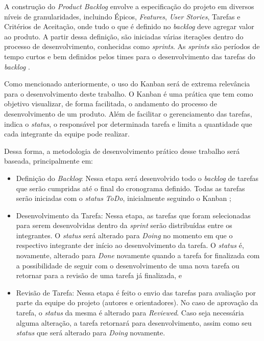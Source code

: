 A construção do \textit{Product Backlog} envolve a especificação do projeto em diversos níveis 
de granularidades, incluindo Épicos, \textit{Features}, \textit{User Stories}, Tarefas e Critérios de 
Aceitação, onde tudo o que é definido no \textit{backlog} deve agregar valor ao produto. A partir 
dessa definição, são iniciadas várias iterações dentro do processo de desenvolvimento, conhecidas 
como \textit{sprints}. As \textit{sprints} são períodos de tempo curtos e bem definidos pelos times 
para o desenvolvimento das tarefas do \textit{backlog} \cite{sutherland2014scrum}.

Como mencionado anteriormente, o uso do Kanban será de extrema relevância para o desenvolvimento deste 
trabalho. O Kanban é uma prática que tem como objetivo visualizar, de forma facilitada, o andamento do processo de 
desenvolvimento de um produto. Além de facilitar o gerenciamento das tarefas, indica o \textit{status}, o responsável 
por determinada tarefa e limita a quantidade que cada integrante da equipe pode realizar.

Dessa forma, a metodologia de desenvolvimento prático desse trabalho será baseada, principalmente em:

\begin{itemize}
    \item Definição do \textit{Backlog}: Nessa etapa será desenvolvido todo o \textit{backlog} de 
    tarefas que serão cumpridas até o final do cronograma definido. Todas as tarefas serão iniciadas 
    com o \textit{status} \textit{ToDo}, inicialmente seguindo o Kanban \cite{ahmad2013kanban};
    \item Desenvolvimento da Tarefa: Nessa etapa, as tarefas que foram selecionadas para serem desenvolvidas 
    dentro da \textit{sprint} serão distribuídas entre os integrantes. O \textit{status} será alterado 
    para \textit{Doing} no momento em que o respectivo integrante der início ao desenvolvimento da tarefa. 
    O \textit{status} é, novamente, alterado para \textit{Done} novamente quando a tarefa for finalizada com 
    a possibilidade de seguir com o desenvolvimento de uma nova tarefa ou retornar para a revisão de uma 
    tarefa já finalizada, e
    \item Revisão de Tarefa: Nessa etapa é feito o envio das tarefas para avaliação por parte da equipe do 
    projeto (autores e orientadores). No caso de aprovação da tarefa, o \textit{status} da mesma é alterado 
    para \textit{Reviewed}. Caso seja necessária alguma alteração, a tarefa retornará para desenvolvimento, 
    assim como seu \textit{status} que será alterado para \textit{Doing} novamente.
\end{itemize}

